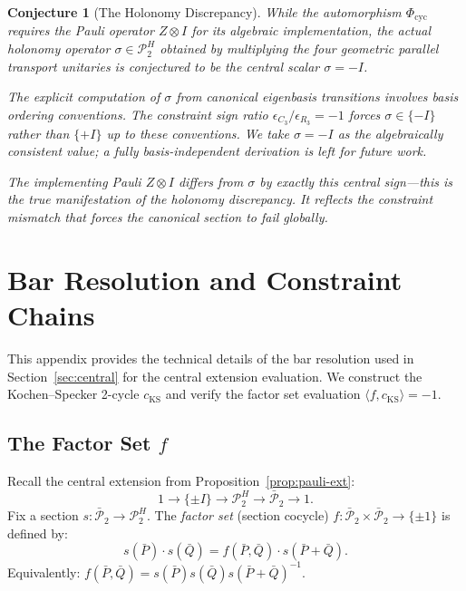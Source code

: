 \documentclass[11pt]{article}
\newtheorem{conjecture}[theorem]{Conjecture}
\begin{document}
\begin{conjecture}[The Holonomy Discrepancy]
\label{conj:holonomy-discrepancy}
While the automorphism $\Phi_{\mathrm{cyc}}$ requires the Pauli operator $Z \otimes I$
for its algebraic implementation, the actual holonomy operator $\sigma \in \mathcal{P}_2^H$
obtained by multiplying the four geometric parallel transport unitaries is conjectured to be the central
scalar $\sigma = -I$.

The explicit computation of $\sigma$ from canonical eigenbasis transitions involves
basis ordering conventions. The constraint sign ratio $\epsilon_{C_3}/\epsilon_{R_3} = -1$
forces $\sigma \in \{-I\}$ rather than $\{+I\}$ up to these conventions. We take
$\sigma = -I$ as the algebraically consistent value; a fully basis-independent derivation
is left for future work.

The implementing Pauli $Z \otimes I$ differs from $\sigma$ by exactly this central
sign---this is the true manifestation of the holonomy discrepancy. It reflects the
constraint mismatch that forces the canonical section to fail globally.
\end{conjecture}


\section{Bar Resolution and Constraint Chains}
\label{app:bar}

This appendix provides the technical details of the bar resolution
used in Section~\ref{sec:central} for the central extension evaluation.
We construct the Kochen--Specker 2-cycle $c_{\mathrm{KS}}$ and
verify the factor set evaluation $\langle f, c_{\mathrm{KS}} \rangle = -1$.

\subsection{The Factor Set $f$}
\label{app:cocycle}

Recall the central extension from Proposition~\ref{prop:pauli-ext}:
\[
  1 \longrightarrow \{\pm I\} \longrightarrow \mathcal{P}_2^H
  \longrightarrow \bar{\mathcal{P}}_2 \longrightarrow 1.
\]
Fix a section $s: \bar{\mathcal{P}}_2 \to \mathcal{P}_2^H$.
The \emph{factor set} (section cocycle) $f: \bar{\mathcal{P}}_2 \times \bar{\mathcal{P}}_2 \to \{\pm 1\}$
is defined by:
\begin{equation}
\label{eq:app-factor-set}
  s(\bar{P}) \cdot s(\bar{Q}) = f(\bar{P}, \bar{Q}) \cdot s(\bar{P} + \bar{Q}).
\end{equation}
Equivalently: $f(\bar{P}, \bar{Q}) = s(\bar{P})s(\bar{Q})s(\bar{P} + \bar{Q})^{-1}$.
\end{document}
